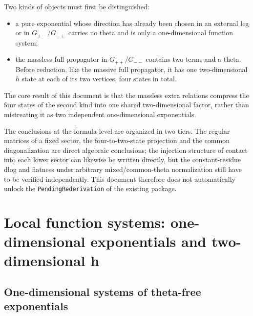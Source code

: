 \documentclass[11pt,a4paper]{article}
\begin{document}
Two kinds of objects must first be distinguished:
\begin{itemize}
  \item a pure exponential whose direction has already been chosen in an external leg or in $G_{+-}/G_{-+}$ carries no theta and is only a one-dimensional function system;
  \item the massless full propagator in $G_{++}/G_{--}$ contains two terms and a theta. Before reduction, like the massive full propagator, it has one two-dimensional $h$ state at each of its two vertices, four states in total.
\end{itemize}
The core result of this document is that the massless extra relations compress the four states of the second kind into one shared two-dimensional factor, rather than mistreating it as two independent one-dimensional exponentials.

The conclusions at the formula level are organized in two tiers. The regular matrices of a fixed sector, the four-to-two-state projection and the common diagonalization are direct algebraic conclusions; the injection structure of contact into each lower sector can likewise be written directly, but the constant-residue dlog and flatness under arbitrary mixed/common-theta normalization still have to be verified independently. This document therefore does not automatically unlock the \texttt{PendingRederivation} of the existing package.

\section{Local function systems: one-dimensional exponentials and two-dimensional h}
\label{sec:local-function-system}

\subsection{One-dimensional systems of theta-free exponentials}
\end{document}

